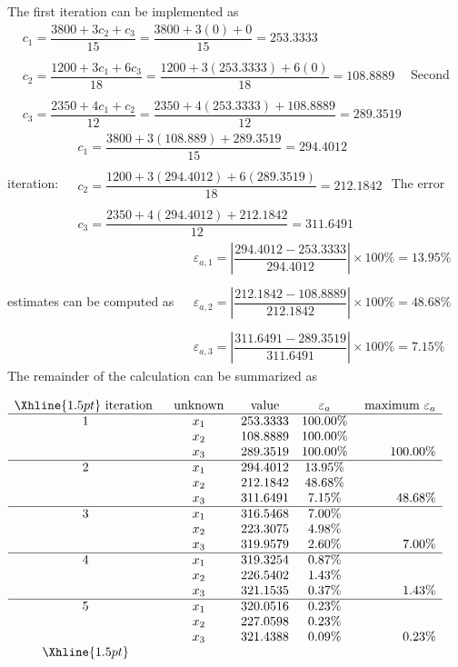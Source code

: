 \documentclass[../main.tex]{subfiles}
\begin{document}
\begin{enumerate}[label=\bfseries(\alph*)]
The first iteration can be implemented as
\bigbreak$
\begin{aligned}
&c_{1}=\dfrac{3800+3 c_{2}+c_{3}}{15}=\dfrac{3800+3(0)+0}{15}=253.3333 \\\\
&c_{2}=\dfrac{1200+3 c_{1}+6 c_{3}}{18}=\dfrac{1200+3(253.3333)+6(0)}{18}=108.8889 \\\\
&c_{3}=\dfrac{2350+4 c_{1}+c_{2}}{12}=\dfrac{2350+4(253.3333)+108.8889}{12}=289.3519
\end{aligned}$
\bigbreak
Second iteration:
\bigbreak$
\begin{aligned}
&c_{1}=\dfrac{3800+3(108.889)+289.3519}{15}=294.4012 \\\\
&c_{2}=\dfrac{1200+3(294.4012)+6(289.3519)}{18}=212.1842 \\\\
&c_{3}=\dfrac{2350+4(294.4012)+212.1842}{12}=311.6491
\end{aligned}$
\bigbreak
The error estimates can be computed as
\bigbreak$
\begin{aligned}
&\varepsilon_{a, 1}=\left|\dfrac{294.4012-253.3333}{294.4012}\right| \times 100 \%=13.95 \% \\\\
&\varepsilon_{a, 2}=\left|\dfrac{212.1842-108.8889}{212.1842}\right| \times 100 \%=48.68 \% \\\\
&\varepsilon_{a, 3}=\left|\dfrac{311.6491-289.3519}{311.6491}\right| \times 100 \%=7.15 \%
\end{aligned}$
\bigbreak
The remainder of the calculation can be summarized as
\bigbreak

$\begin{array}{ccccr}
\Xhline{1.5pt} \text { iteration } & \text { unknown } & \text { value } & \varepsilon_{a} & \text { maximum } \varepsilon_{a} \\
\hline 1 & x_{1} & 253.3333 & 100.00 \% & \\
& x_{2} & 108.8889 & 100.00 \% & \\
& x_{3} & 289.3519 & 100.00 \% & 100.00 \% \\
\hline 2 & x_{1} & 294.4012 & 13.95 \% & \\
& x_{2} & 212.1842 & 48.68 \% & \\
& x_{3} & 311.6491 & 7.15 \% & 48.68 \% \\
\hline 3 & x_{1} & 316.5468 & 7.00 \% & \\
& x_{2} & 223.3075 & 4.98 \% & \\
& x_{3} & 319.9579 & 2.60 \% & 7.00 \% \\
\hline 4 & x_{1} & 319.3254 & 0.87 \% & \\
& x_{2} & 226.5402 & 1.43 \% & \\
& x_{3} & 321.1535 & 0.37 \% & 1.43 \% \\
\hline 5 & x_{1} & 320.0516 & 0.23 \% & \\
& x_{2} & 227.0598 & 0.23 \% & \\
& x_{3} & 321.4388 & 0.09 \% & 0.23 \% \\
\Xhline{1.5pt}
\end{array}$


\end{enumerate}
\end{document}
